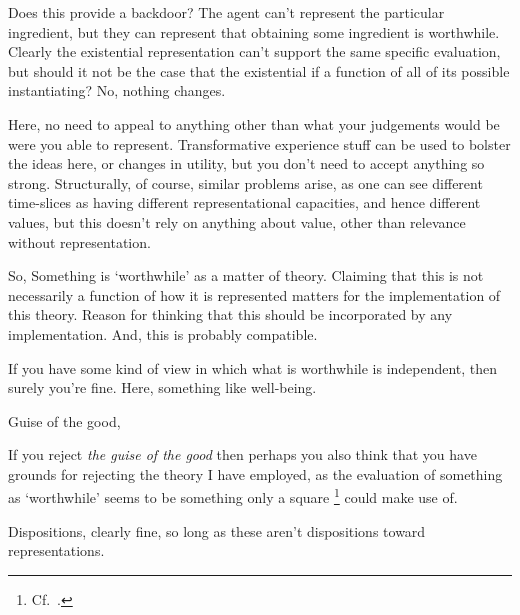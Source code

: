 \documentclass[10pt]{article}
\begin{document}
Does this provide a backdoor?
The agent can't represent the particular ingredient, but they can represent that obtaining some ingredient is worthwhile.
Clearly the existential representation can't support the same specific evaluation, but should it not be the case that the existential if a function of all of its possible instantiating?
No, nothing changes.

Here, no need to appeal to anything other than what your judgements would be were you able to represent.
Transformative experience stuff can be used to bolster the ideas here, or changes in utility, but you don't need to accept anything so strong.
Structurally, of course, similar problems arise, as one can see different time-slices as having different representational capacities, and hence different values, but this doesn't rely on anything about value, other than relevance without representation.

So, 
Something is `worthwhile' as a matter of theory.
Claiming that this is not necessarily a function of how it is represented matters for the implementation of this theory.
Reason for thinking that this should be incorporated by any implementation.
And, this is probably compatible.

If you have some kind of view in which what is worthwhile is independent, then surely you're fine.
Here, something like well-being.

Guise of the good,

If you reject \emph{the guise of the good} then perhaps you also think that you have grounds for rejecting the theory I have employed, as the evaluation of something as `worthwhile' seems to be something only a square\nolinebreak
\footnote{Cf.\ \textcite{Velleman:1992aa}.}
could make use of.


Dispositions, clearly fine, so long as these aren't dispositions toward representations.
\end{document}
